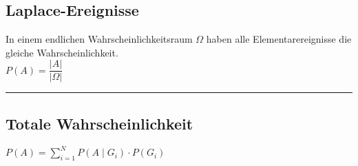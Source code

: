 \subsection{Laplace-Ereignisse  }
In einem endlichen Wahrscheinlichkeitsraum $\Omega$ haben alle
Elementarereignisse die gleiche Wahrscheinlichkeit. \\
$P(A)=\dfrac{\left| A\right|}{\left|\Omega\right|}$ \\
\hrule

\subsection{Totale Wahrscheinlichkeit  }
$P(A)=\sum\limits_{i=1}^N P(A\mid G_i)\cdot P(G_i)$ 